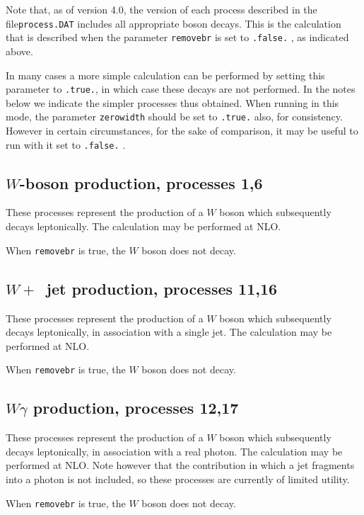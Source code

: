 \documentclass[12pt]{article}
\begin{document}
Note that, as of version 4.0, the version of each process described in the file{\tt process.DAT} includes all appropriate boson decays. This is the 
calculation
that is described when the parameter {\tt removebr} is set to {\tt .false.} ,
as indicated above.

In many cases a more simple calculation can be performed by setting this
parameter to {\tt .true.}, in which case these decays are not performed. In the
notes below we indicate the simpler processes thus obtained. When running in
this mode, the parameter {\tt zerowidth} should be set to {\tt .true.} also,
for consistency. However in certain circumstances, for the sake of comparison,
it may be useful to run with it set to {\tt .false.} .

\subsection{$W$-boson production, processes 1,6}
\label{subsec:wboson}

These processes represent the production of a $W$ boson which subsequently
decays leptonically. The calculation may be performed at NLO.

When {\tt removebr} is true, the $W$ boson does not decay.

\subsection{$W+$~jet production, processes 11,16}
\label{subsec:w1jet}

These processes represent the production of a $W$ boson which subsequently
decays leptonically, in association with a single jet.
The calculation may be performed at NLO.

When {\tt removebr} is true, the $W$ boson does not decay.

\subsection{$W\gamma$ production, processes 12,17}
\label{subsec:wgamma}

These processes represent the production of a $W$ boson which subsequently
decays leptonically, in association with a real photon.
The calculation may be performed at NLO. Note however that the contribution
in which a jet fragments into a photon is not included, so these processes 
are currently of limited utility.

When {\tt removebr} is true, the $W$ boson does not decay.
\end{document}
